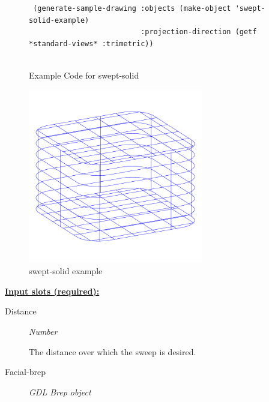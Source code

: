 \documentclass [11pt]{book}
\begin{document}
\begin{itemize}
\begin{figure}
\begin{lrbox}{\boxedverb}
\begin{minipage}{\linewidth}
{\begin{verbatim}
 (generate-sample-drawing :objects (make-object 'swept-solid-example)
                          :projection-direction (getf *standard-views* :trimetric))


\end{verbatim}}
\end{minipage}
\end{lrbox}
\fbox{\usebox{\boxedverb}}

\caption{Example Code for swept-solid}

\label{fig:example-code-swept-solid}

\end{figure}

\begin{figure}
\begin{center}
\includegraphics[width=3in,height=3in]{../images/example-swept-solid.pdf}
\end{center}

\caption{swept-solid example}

\label{fig:swept-solid}

\end{figure}





\textbf{
\underline{Input slots (required):}}

\begin{description}

\item [Distance]
\emph{Number}

 The distance over which the sweep is desired.




\item [Facial-brep]
\emph{GDL Brep object}


\end{description}
\end{itemize}
\end{document}
